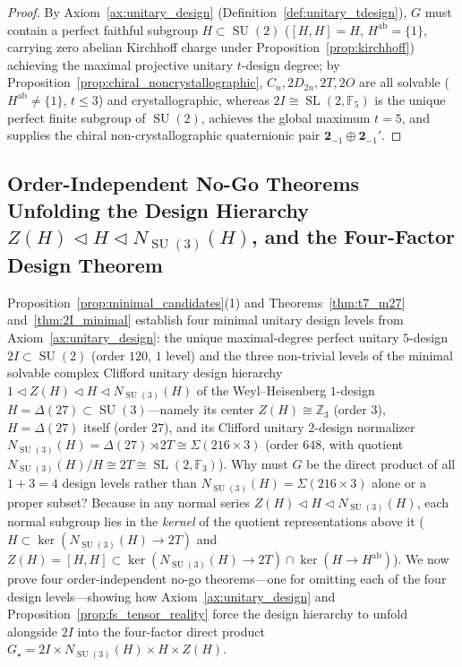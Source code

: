 \documentclass[11pt,a4paper]{article}
\theoremstyle{definition}
\theoremstyle{remark}
\newcommand{\Z}{\mathbb{Z}}
\newcommand{\F}{\mathbb{F}}
\newcommand{\SU}{\operatorname{SU}}
\newcommand{\SL}{\operatorname{SL}}
\newcommand{\Gstar}{G_\star}
\begin{document}
\begin{proof}
By Axiom~\ref{ax:unitary_design} (Definition~\ref{def:unitary_tdesign}), $G$ must contain a perfect faithful subgroup $H \subset \SU(2)$ ($[H, H] = H$, $H^{\mathrm{ab}} = \{1\}$, carrying zero abelian Kirchhoff charge under Proposition~\ref{prop:kirchhoff}) achieving the maximal projective unitary $t$-design degree; by Proposition~\ref{prop:chiral_noncrystallographic}, $C_n, 2D_{2n}, 2T, 2O$ are all solvable ($H^{\mathrm{ab}} \neq \{1\}$, $t \le 3$) and crystallographic, whereas $2I \cong \SL(2,\F_5)$ is the unique perfect finite subgroup of $\SU(2)$, achieves the global maximum $t = 5$, and supplies the chiral non-crystallographic quaternionic pair $\mathbf{2}_{-1} \oplus \mathbf{2}_{-1}'$.
\end{proof}

\subsection{Order-Independent No-Go Theorems Unfolding the Design Hierarchy \texorpdfstring{$Z(H) \triangleleft H \triangleleft N_{\SU(3)}(H)$}{Z(H) < H < N\_SU(3)(H)}, and the Four-Factor Design Theorem}

Proposition~\ref{prop:minimal_candidates}(1) and Theorems~\ref{thm:t7_m27} and~\ref{thm:2I_minimal} establish four minimal unitary design levels from Axiom~\ref{ax:unitary_design}: the unique maximal-degree perfect unitary $5$-design $2I \subset \SU(2)$ (order $120$, $1$ level) and the three non-trivial levels of the minimal solvable complex Clifford unitary design hierarchy $1 \triangleleft Z(H) \triangleleft H \triangleleft N_{\SU(3)}(H)$ of the Weyl--Heisenberg $1$-design $H = \Delta(27) \subset \SU(3)$---namely its center $Z(H) \cong \Z_3$ (order $3$), $H = \Delta(27)$ itself (order $27$), and its Clifford unitary $2$-design normalizer $N_{\SU(3)}(H) = \Delta(27) \rtimes 2T \cong \Sigma(216 \times 3)$ (order $648$, with quotient $N_{\SU(3)}(H)/H \cong 2T \cong \SL(2,\F_3)$). Why must $G$ be the direct product of all $1 + 3 = 4$ design levels rather than $N_{\SU(3)}(H) = \Sigma(216 \times 3)$ alone or a proper subset? Because in any normal series $Z(H) \triangleleft H \triangleleft N_{\SU(3)}(H)$, each normal subgroup lies in the \emph{kernel} of the quotient representations above it ($H \subset \ker(N_{\SU(3)}(H) \to 2T)$ and $Z(H) = [H,H] \subset \ker(N_{\SU(3)}(H) \to 2T) \cap \ker(H \to H^{\mathrm{ab}})$). We now prove four order-independent no-go theorems---one for omitting each of the four design levels---showing how Axiom~\ref{ax:unitary_design} and Proposition~\ref{prop:fs_tensor_reality} force the design hierarchy to unfold alongside $2I$ into the four-factor direct product $\Gstar = 2I \times N_{\SU(3)}(H) \times H \times Z(H)$.
\end{document}
